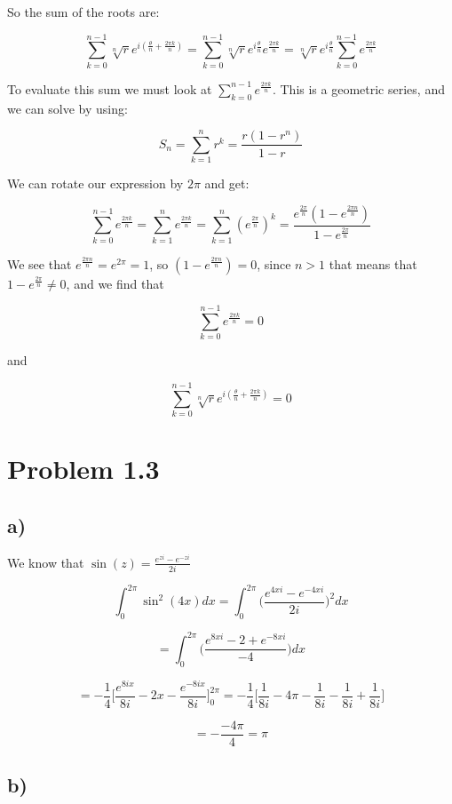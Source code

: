 \documentclass[a4paper,norsk, 10pt]{article}
\begin{document}
So the sum of the roots are:

$$
\sum_{k = 0}^{n-1}\sqrt[n]{r}e^{i(\frac{\theta}{n} + \frac{2\pi k}{n})} = 
\sum_{k = 0}^{n-1}\sqrt[n]{r}e^{i\frac{\theta}{n}}e^{\frac{2\pi k}{n}} = 
\sqrt[n]{r}e^{i\frac{\theta}{n}} \sum_{k = 0}^{n-1}e^{\frac{2\pi k}{n}}
$$

To evaluate this sum we must look at $\sum_{k = 0}^{n-1}e^{\frac{2\pi k}{n}}$. This is a geometric series, and we can solve by using:

$$
S_n = \sum_{k = 1}^{n} r^k =\frac{r(1-r^n)}{1-r}
$$

We can rotate our expression by $2\pi$ and get:

$$
\sum_{k = 0}^{n-1}e^{\frac{2\pi k}{n}} = \sum_{k = 1}^{n}e^{\frac{2\pi k}{n}} =
\sum_{k = 1}^{n}(e^{\frac{2\pi}{n}})^k = \frac{e^{\frac{2\pi}{n}}(1-e^{\frac{2\pi n}{n}})}{1-e^{\frac{2\pi}{n}}}
$$

We see that $e^{\frac{2\pi n}{n}} = e^{2\pi} = 1$, so $(1-e^{\frac{2\pi n}{n}}) = 0$, since $n>1$ that means that $1-e^{\frac{2\pi}{n}} \neq 0$, and we find that

$$
\sum_{k = 0}^{n-1}e^{\frac{2\pi k}{n}} = 0
$$ 

and

$$
\sum_{k = 0}^{n-1}\sqrt[n]{r}e^{i(\frac{\theta}{n} + \frac{2\pi k}{n})} = 0
$$

\section*{Problem 1.3}
\subsection*{a)}

We know that $\sin(z) = \frac{e^{zi} - e^{-zi}}{2i}$

$$
\int_0^{2\pi} \sin^2(4x) dx = \int_0^{2\pi} \big( \frac{e^{4xi} - e^{-4xi}}{2i} \big) ^2 dx
$$

$$
= \int_0^{2\pi} \big( \frac{e^{8xi} -2 + e^{-8xi}}{-4} \big) dx
$$

$$
= -\frac{1}{4} \big[ \frac{e^{8ix}}{8i} - 2x - \frac{e^{-8ix}}{8i} \big]_0^{2\pi} = -\frac{1}{4} \big[ \frac{1}{8i} -4\pi - \frac{1}{8i} -\frac{1}{8i} + \frac{1}{8i} \big] 
$$

$$
= -\frac{-4\pi}{4} = \pi
$$

\subsection*{b)}
\end{document}
